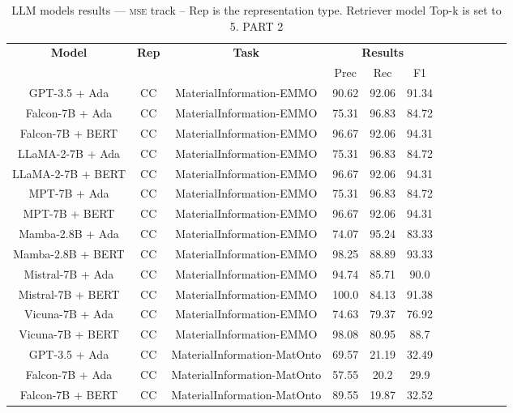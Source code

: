 \begin{table}
        \centering
        \small
        \caption{LLM models results --- \textsc{mse} track -- Rep is the representation type. Retriever model Top-k is set to 5. PART 2 } \label{tab:llm_mse2}
        \begin{tabular}{|c|c|c|c|c|c|c|c|c|c|c|c|}
            \hline
             \multirow{2}{*}{\textbf{Model}}  & \multirow{2}{*}{\textbf{Rep}}  & \multirow{2}{*}{\textbf{Task}} &  \multicolumn{3}{c|}{\textbf{Results}} \\
             \cline{4-6}
              & & & Prec & Rec & F1  \\
            \hline
	GPT-3.5 + Ada  & CC & MaterialInformation-EMMO  &  90.62 &  92.06 & 91.34  \\
	Falcon-7B + Ada  & CC & MaterialInformation-EMMO  &  75.31 &  96.83 & 84.72  \\
	Falcon-7B + BERT  & CC & MaterialInformation-EMMO  &  96.67 &  92.06 & 94.31  \\
	LLaMA-2-7B + Ada  & CC & MaterialInformation-EMMO  &  75.31 &  96.83 & 84.72  \\
	LLaMA-2-7B + BERT  & CC & MaterialInformation-EMMO  &  96.67 &  92.06 & 94.31  \\
	MPT-7B + Ada  & CC & MaterialInformation-EMMO  &  75.31 &  96.83 & 84.72  \\
	MPT-7B + BERT  & CC & MaterialInformation-EMMO  &  96.67 &  92.06 & 94.31  \\
	Mamba-2.8B + Ada  & CC & MaterialInformation-EMMO  &  74.07 &  95.24 & 83.33  \\
	Mamba-2.8B + BERT  & CC & MaterialInformation-EMMO  &  98.25 &  88.89 & 93.33  \\
	Mistral-7B + Ada  & CC & MaterialInformation-EMMO  &  94.74 &  85.71 & 90.0  \\
	Mistral-7B + BERT  & CC & MaterialInformation-EMMO  &  100.0 &  84.13 & 91.38  \\
	Vicuna-7B + Ada  & CC & MaterialInformation-EMMO  &  74.63 &  79.37 & 76.92  \\
	Vicuna-7B + BERT  & CC & MaterialInformation-EMMO  &  98.08 &  80.95 & 88.7  \\
	\hline
	GPT-3.5 + Ada  & CC & MaterialInformation-MatOnto  &  69.57 &  21.19 & 32.49  \\
	Falcon-7B + Ada  & CC & MaterialInformation-MatOnto  &  57.55 &  20.2 & 29.9  \\
	Falcon-7B + BERT  & CC & MaterialInformation-MatOnto  &  89.55 &  19.87 & 32.52  \\

\end{tabular}
\end{table}

